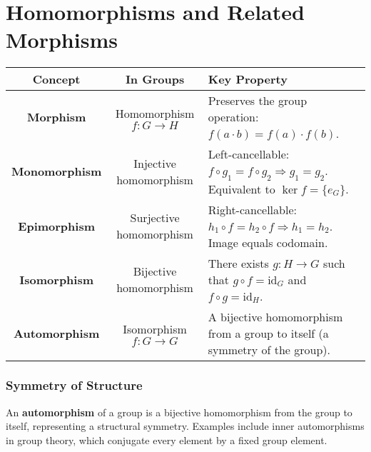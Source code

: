 \documentclass[12pt]{article}
\begin{document}
\section*{Homomorphisms and Related Morphisms}

\begin{center}
	\renewcommand{\arraystretch}{1.4}
	\begin{tabular}{|c|c|p{7cm}|}
		\hline
		\textbf{Concept} & \textbf{In Groups} & \textbf{Key Property} \\
		\hline
		\textbf{Morphism} & Homomorphism \( f : G \to H \) & Preserves the group operation: \( f(a \cdot b) = f(a) \cdot f(b) \). \\
		\hline
		\textbf{Monomorphism} & Injective homomorphism & Left-cancellable: \( f \circ g_1 = f \circ g_2 \Rightarrow g_1 = g_2 \). Equivalent to \( \ker f = \{e_G\} \). \\
		\hline
		\textbf{Epimorphism} & Surjective homomorphism & Right-cancellable: \( h_1 \circ f = h_2 \circ f \Rightarrow h_1 = h_2 \). Image equals codomain. \\
		\hline
		\textbf{Isomorphism} & Bijective homomorphism & There exists \( g : H \to G \) such that \( g \circ f = \mathrm{id}_G \) and \( f \circ g = \mathrm{id}_H \). \\
		\hline
		\textbf{Automorphism} & Isomorphism \( f : G \to G \) & A bijective homomorphism from a group to itself (a symmetry of the group). \\
		\hline
	\end{tabular}
\end{center}

\subsubsection*{Symmetry of Structure}
An \textbf{automorphism} of a group is a bijective homomorphism from the group to itself, representing a structural symmetry. Examples include inner automorphisms in group theory, which conjugate every element by a fixed group element.
\end{document}
